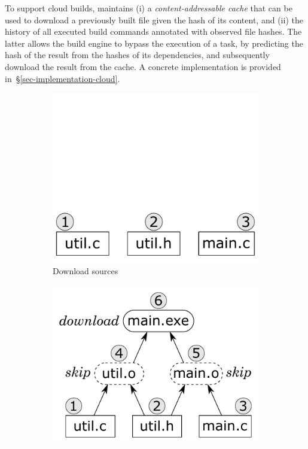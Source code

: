 To support cloud builds, \Bazel maintains (i) a \emph{content-addressable cache}
that can be used to download a previously built file given the hash of its
content, and (ii) the history of all executed build commands annotated with
observed file hashes. The latter allows the build engine to bypass the execution
of a task, by predicting the hash of the result from the hashes of its
dependencies, and subsequently download the result from the cache. A concrete
implementation is provided in~\S\ref{sec-implementation-cloud}.

\begin{figure}
\begin{subfigure}[b]{0.25\linewidth}
\centerline{\includegraphics[scale=0.28]{fig/bazel-example-checkout.pdf}}
\caption{Download sources}
\end{subfigure}
\begin{subfigure}[b]{0.40\linewidth}
\centerline{\includegraphics[scale=0.28]{fig/bazel-example-build.pdf}}

\end{subfigure}
\end{figure}

